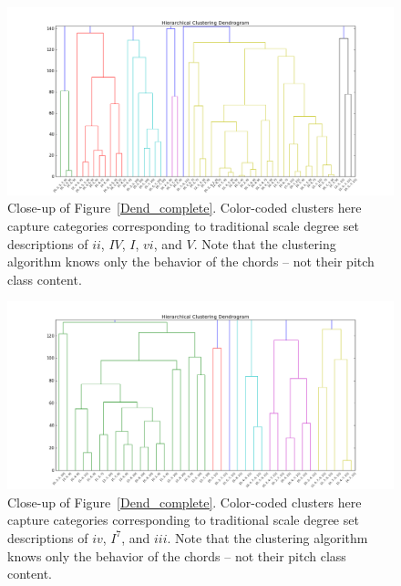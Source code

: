\begin{figure}
	\centering
	\includegraphics[width=6.5in]{Dend_ii_IV_I_vi_V.png}
	\caption{Close-up of Figure~\ref{Dend_complete}.  Color-coded clusters here capture categories corresponding to traditional scale degree set descriptions of $ii$, $IV$, $I$, $vi$, and $V$.  Note that the clustering algorithm knows only the behavior of the chords -- not their pitch class content.}
	\label{Dend_sub1}
\end{figure}
\begin{figure}
	\centering
	\includegraphics[width=6.5in]{Dend_iv_I7_iii.png}
	\caption{Close-up of Figure~\ref{Dend_complete}.  Color-coded clusters here capture categories corresponding to traditional scale degree set descriptions of $iv$, $I^7$, and $iii$.  Note that the clustering algorithm knows only the behavior of the chords -- not their pitch class content.}
	\label{Dend_sub2}
\end{figure}

